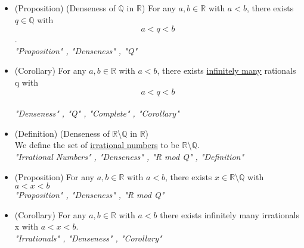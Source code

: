 \documentclass{article}
\begin{document}
\begin{itemize}
    \item (Proposition) (Denseness of $\mathbb{Q}$ in $\mathbb{R}$) For any $a,b \in \mathbb{R}$ with $a<b$, there exists $q \in \mathbb{Q}$ with $$a<q<b$$. \\
    \vspace{.25cm} \textit{"Proposition" , "Denseness" , "Q"}
    
    \item (Corollary) For any $a , b \in \mathbb{R}$ with $ a<b$, there exists \underline{infinitely many} rationals q with $$a<q<b$$ \\
    \vspace{.25cm} \textit{"Denseness" , "Q" , "Complete" , "Corollary"}
    
    \item (Definition) (Denseness of $\mathbb{R}$\textbackslash $\mathbb{Q}$ in $\mathbb{R}$)\\ We define the set of \underline{irrational numbers} to be $\mathbb{R}$\textbackslash $\mathbb{Q}$. \\
    \vspace{.25cm} \textit{"Irrational Numbers" , "Denseness" , "R mod Q" , "Definition"}
    
    \item (Proposition) For any $a,b \in \mathbb{R}$ with $a<b$, there exists $x \in \mathbb{R}$\textbackslash $\mathbb{Q}$ with $a<x<b$ \\
    \vspace{.25cm} \textit{"Proposition" , "Denseness" , "R mod Q"}
    
    \item (Corollary) For any $a,b \in \mathbb{R}$ with $a<b$ there exists infinitely many irrationals x with $a<x<b$.\\
    \vspace{.25cm} \textit{"Irrationals" , "Denseness" , "Corollary"}
    
    
\end{itemize}
\end{document}
